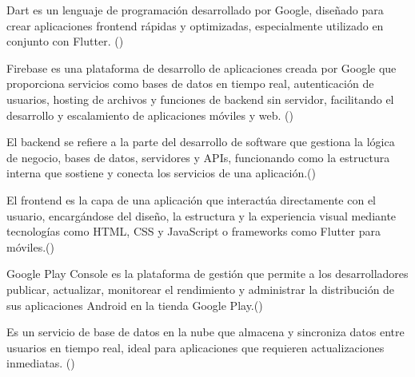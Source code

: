 \begin{definition}[Dart]

Dart es un lenguaje de programación desarrollado por Google, diseñado para crear aplicaciones frontend rápidas y optimizadas, especialmente utilizado en conjunto con Flutter. (\cite{dart})
\end{definition}
\begin{definition}[Firebase]

Firebase es una plataforma de desarrollo de aplicaciones creada por Google que proporciona servicios como bases de datos en tiempo real, autenticación de usuarios, hosting de archivos y funciones de backend sin servidor, facilitando el desarrollo y escalamiento de aplicaciones móviles y web. (\cite{firebase})
\end{definition}


\begin{definition}[Backend]
El backend se refiere a la parte del desarrollo de software que gestiona la lógica de negocio, bases de datos, servidores y APIs, funcionando como la estructura interna que sostiene y conecta los servicios de una aplicación.(\cite{backend})
\end{definition}



\begin{definition}[Frontend]
  El frontend es la capa de una aplicación que interactúa directamente con el usuario, encargándose del diseño, la estructura y la experiencia visual mediante tecnologías como HTML, CSS y JavaScript o frameworks como Flutter para móviles.(\cite{frontend})
\end{definition}




\begin{definition}
  Google Play Console es la plataforma de gestión que permite a los desarrolladores publicar, actualizar, monitorear el rendimiento y administrar la distribución de sus aplicaciones Android en la tienda Google Play.(\cite{googleplayconsole})


\end{definition}

\begin{definition}
Es un servicio de base de datos en la nube que almacena y sincroniza datos entre usuarios en tiempo real, ideal para aplicaciones que requieren actualizaciones inmediatas. (\cite{firebaserealtime})
\end{definition}
















